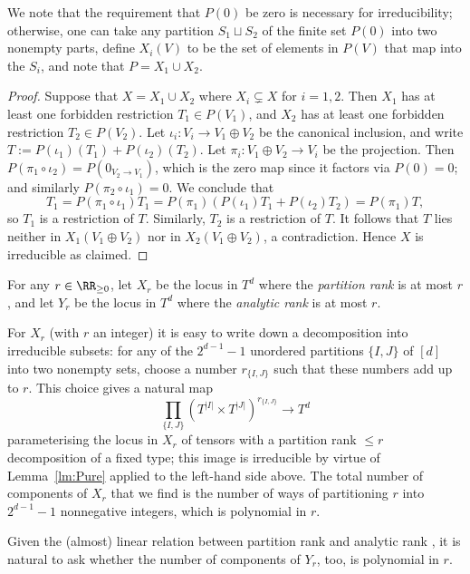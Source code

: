 \documentclass{amsart}
\begin{document}
We note that the requirement that $P(0)$ be zero is necessary for
irreducibility; otherwise, one can take any partition $S_1 \sqcup S_2$
of the finite set $P(0)$ into two nonempty parts, define $X_i(V)$ to
be the set of elements in $P(V)$ that map into the $S_i$, and note that
$P=X_1 \cup X_2$.

\begin{proof}
Suppose that $X=X_1 \cup X_2$ where $X_i \subsetneq X$
for $i=1,2$. Then $X_1$ has at least one forbidden restriction $T_1
\in P(V_1)$, and $X_2$ has at least one forbidden restriction $T_2 \in
P(V_2)$. Let $\iota_i: V_i \to V_1 \oplus V_2$ be the canonical inclusion,
and write $T:=P(\iota_1)(T_1) + P(\iota_2)(T_2)$. Let $\pi_i:V_1 \oplus
V_2 \to V_i$ be the projection. Then $P(\pi_1 \circ \iota_2)=P(0_{V_2
\to V_1})$, which is the zero map since it factors via $P(0)=0$; and
similarly $P(\pi_2 \circ \iota_1)=0$. We conclude that 
\[ T_1=P(\pi_1 \circ \iota_1)T_1 = P(\pi_1)(P(\iota_1)T_1 +
P(\iota_2)T_2)=P(\pi_1)T, \]
so $T_1$ is a restriction of $T$. Similarly, $T_2$ is a restriction
of $T$. It follows that $T$ lies neither in $X_1(V_1 \oplus V_2)$ nor
in $X_2(V_1 \oplus V_2)$, a contradiction. Hence $X$ is irreducible as
claimed. 
\end{proof}

\begin{ex}
For any $r \in \RR_{\geq 0}$, let $X_r$ be the locus in $T^d$ where the
{\em partition rank} is at most $r$, and let $Y_r$ be the locus in $T^d$
where the {\em analytic rank} is at most $r$.

For $X_r$ (with $r$ an integer) it is easy to write down a decomposition
into irreducible subsets: for any of the $2^{d-1}-1$ unordered partitions
$\{I,J\}$ of $[d]$ into two nonempty sets, choose a number $r_{\{I,J\}}$
such that these numbers add up to $r$. This choice gives a natural map
\[ \prod_{\{I,J\}} (T^{|I|} \times T^{|J|})^{r_{\{I,J\}}} \to T^d \]
parameterising the locus in $X_r$ of tensors with a partition rank $\leq
r$ decomposition of a fixed type; this image is irreducible by virtue
of Lemma~\ref{lm:Pure} applied to the left-hand side above.
The total number of components of $X_r$
that we find is the number of ways of partitioning $r$ into $2^{d-1}-1$
nonnegative integers, which is polynomial in $r$. 

Given the (almost) linear relation between partition rank and analytic
rank \cite{Cohen21,Moshkovitz22}, it is natural to ask whether the number
of components of $Y_r$, too, is polynomial in $r$.
\end{ex}
\end{document}
